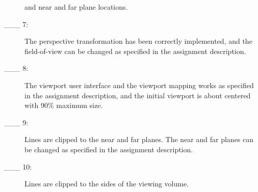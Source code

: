 \begin{description}
        and near and far plane locations.
\item[\_\_\_ 7:]
	The perspective transformation has been correctly implemented,
	and the field-of-view can be changed as specified in the 
        assignment description.
\item[\_\_\_ 8:]
	The viewport user interface and the viewport mapping works 
        as specified in the assignment description, and the initial
        viewport is about centered with 90\% maximum size.
\item[\_\_\_ 9:]
        Lines are clipped to the near and far planes.  The near and
        far planes can be changed as specified in the assignment
        description.
\item[\_\_\_ 10:]
        Lines are clipped to the sides of the viewing volume.

\end{description}



